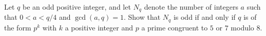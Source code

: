 Let $q$ be an odd positive integer, and let $N_q$ denote the number of integers $a$ such that $0 < a < q/4$ and $\gcd(a,q) = 1$. Show that $N_q$ is odd if and only if $q$ is of the form $p^k$ with $k$ a positive integer and $p$ a prime congruent to $5$ or $7$ modulo $8$.
